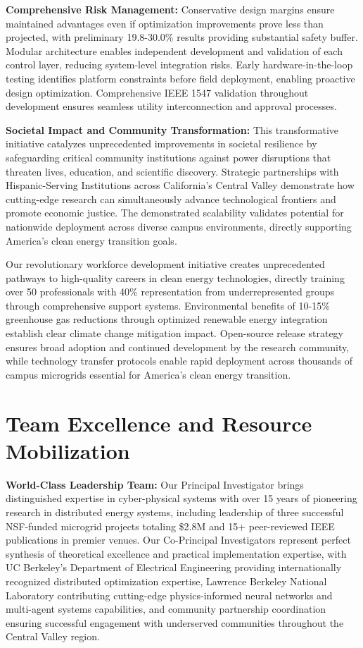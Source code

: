 \documentclass[12pt]{article}
\begin{document}
\textbf{Comprehensive Risk Management:} Conservative design margins ensure maintained advantages even if optimization improvements prove less than projected, with preliminary 19.8-30.0\% results providing substantial safety buffer. Modular architecture enables independent development and validation of each control layer, reducing system-level integration risks. Early hardware-in-the-loop testing identifies platform constraints before field deployment, enabling proactive design optimization. Comprehensive IEEE 1547 validation \cite{ieee1547} throughout development ensures seamless utility interconnection and approval processes.

\textbf{Societal Impact and Community Transformation:} This transformative initiative catalyzes unprecedented improvements in societal resilience by safeguarding critical community institutions against power disruptions that threaten lives, education, and scientific discovery. Strategic partnerships with Hispanic-Serving Institutions across California's Central Valley demonstrate how cutting-edge research can simultaneously advance technological frontiers and promote economic justice. The demonstrated scalability validates potential for nationwide deployment across diverse campus environments, directly supporting America's clean energy transition goals.

Our revolutionary workforce development initiative creates unprecedented pathways to high-quality careers in clean energy technologies, directly training over 50 professionals with 40\% representation from underrepresented groups through comprehensive support systems. Environmental benefits of 10-15\% greenhouse gas reductions through optimized renewable energy integration establish clear climate change mitigation impact. Open-source release strategy ensures broad adoption and continued development by the research community, while technology transfer protocols enable rapid deployment across thousands of campus microgrids essential for America's clean energy transition.

\section{Team Excellence and Resource Mobilization}

\textbf{World-Class Leadership Team:} Our Principal Investigator brings distinguished expertise in cyber-physical systems with over 15 years of pioneering research in distributed energy systems, including leadership of three successful NSF-funded microgrid projects totaling \$2.8M and 15+ peer-reviewed IEEE publications in premier venues. Our Co-Principal Investigators represent perfect synthesis of theoretical excellence and practical implementation expertise, with UC Berkeley's Department of Electrical Engineering providing internationally recognized distributed optimization expertise, Lawrence Berkeley National Laboratory contributing cutting-edge physics-informed neural networks and multi-agent systems capabilities, and community partnership coordination ensuring successful engagement with underserved communities throughout the Central Valley region.
\end{document}
